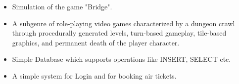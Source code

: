 \documentclass[10pt,a4paper,ragged2e,withhyper]{altacv}
\begin{document}
\begin{paracol}{2}




\begin{itemize}
    \item Simulation of the game "Bridge".
\end{itemize}

\divider

\begin{itemize}
\item 
A subgenre of role-playing video games characterized by a dungeon crawl through procedurally generated levels, turn-based gameplay, tile-based graphics, and permanent death of the player character.
\end{itemize}

\divider

\begin{itemize}
    \item Simple Database which supports operations like INSERT, SELECT etc.
\end{itemize}

\divider

\begin{itemize}
    \item A simple system for Login and for booking air tickets.
\end{itemize}


\end{paracol}
\end{document}
